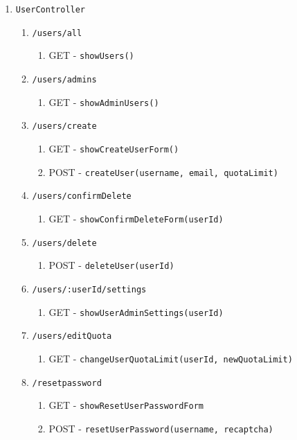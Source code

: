\documentclass[12pt,DIV14,BCOR10mm,a4paper,parskip=half-,headsepline,headinclude,english,ngerman,bibliography=totocnumbered]{scrreprt}
\begin{document}
\begin{enumerate}
\begin{enumerate}
    \item \texttt{UserController}
    \begin{enumerate}
      \item \texttt{/users/all}
      \begin{enumerate}
        \item GET - \texttt{showUsers()}
      \end{enumerate}
      \item \texttt{/users/admins}
      \begin{enumerate}
        \item GET - \texttt{showAdminUsers()}
      \end{enumerate}
      \item \texttt{/users/create}
      \begin{enumerate}
        \item GET - \texttt{showCreateUserForm()}
        \item POST - \texttt{createUser(username, email, quotaLimit)}
      \end{enumerate}
      \item \texttt{/users/confirmDelete}
      \begin{enumerate}
        \item GET - \texttt{showConfirmDeleteForm(userId)}
      \end{enumerate}
      \item \texttt{/users/delete}
      \begin{enumerate}
        \item POST - \texttt{deleteUser(userId)}
      \end{enumerate}
      \item \texttt{/users/:userId/settings}
      \begin{enumerate}
        \item GET - \texttt{showUserAdminSettings(userId)}
      \end{enumerate}
      \item \texttt{/users/editQuota}
      \begin{enumerate}
        \item GET - \texttt{changeUserQuotaLimit(userId, 
        newQuotaLimit)}
      \end{enumerate}
      \item \texttt{/resetpassword}
      \begin{enumerate}
        \item GET - \texttt{showResetUserPasswordForm}
        \item POST - \texttt{resetUserPassword(username, recaptcha)}

\end{enumerate}
\end{enumerate}
\end{enumerate}
\end{enumerate}
\end{document}
